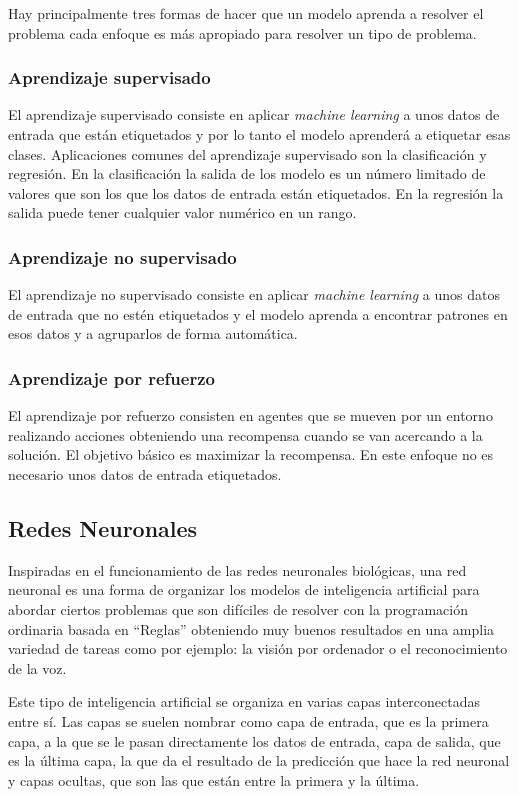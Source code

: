 \documentclass[12pt,a4paper]{article}
\begin{document}
Hay principalmente tres formas de hacer que un modelo aprenda a resolver el problema cada enfoque es más apropiado para resolver un tipo de problema.

\subsubsection{Aprendizaje supervisado}
El aprendizaje supervisado consiste en aplicar \textit{machine learning} a unos datos de entrada que están etiquetados y por lo tanto el modelo aprenderá a etiquetar esas clases. Aplicaciones comunes del aprendizaje supervisado son la clasificación y regresión. En la clasificación la salida de los modelo es un número limitado de valores que son los que los datos de entrada están etiquetados. En la regresión la salida puede tener cualquier valor numérico en un rango.

\subsubsection{Aprendizaje no supervisado}
El aprendizaje no supervisado consiste en aplicar \textit{machine learning} a unos datos de entrada que no estén etiquetados y el modelo aprenda a encontrar patrones en esos datos y a agruparlos de forma automática.

\subsubsection{Aprendizaje por refuerzo}
El aprendizaje por refuerzo consisten en agentes que se mueven por un entorno realizando acciones obteniendo una recompensa cuando se van acercando a la solución. El objetivo básico es maximizar la recompensa. En este enfoque no es necesario unos datos de entrada etiquetados.

\subsection{Redes Neuronales}
Inspiradas en el funcionamiento de las redes neuronales biológicas, una red neuronal es una forma de organizar los modelos de inteligencia artificial para abordar ciertos problemas que son difíciles de resolver con la programación ordinaria basada en ``Reglas'' obteniendo muy buenos resultados en una amplia variedad de tareas como por ejemplo: la visión por ordenador o el reconocimiento de la voz.
\bigskip

Este tipo de inteligencia artificial se organiza en varias capas interconectadas entre sí. Las capas se suelen nombrar como capa de entrada, que es la primera capa, a la que se le pasan directamente los datos de entrada, capa de salida, que es la última capa, la que da el resultado de la predicción que hace la red neuronal y capas ocultas, que son las que están entre la primera y la última.
\bigskip
\end{document}
